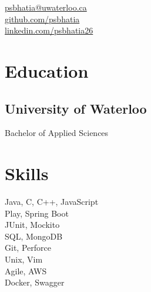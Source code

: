 \documentclass[]{hieudo-build}
\begin{document}
%
%
\color{myyellow}
{
	\color{myblue}\faEnvelope \href{mailto:psbhatia@uwaterloo.ca}{ psbhatia@uwaterloo.ca}\\
	\faGithub \href{https://github.com/psbhatia}{   github.com/psbhatia}\\
	\faLinkedinSquare \href{https://www.linkedin.com/in/psbhatia26}{   linkedin.com/psbhatia26}
}
    
%
%
\begin{minipage}[t]{0.34\textwidth}
\section{Education} 

\subsection{University of Waterloo}
Bachelor of Applied Sciences \\
\sectionsep


\section{Skills}
Java, C, C++, JavaScript\\ 

Play, Spring Boot\\
JUnit, Mockito\\

SQL, MongoDB\\

Git, Perforce \\
Unix, Vim \\ 
Agile, AWS \\ 
Docker, Swagger \\

\sectionsep



\end{minipage}
\end{document}
